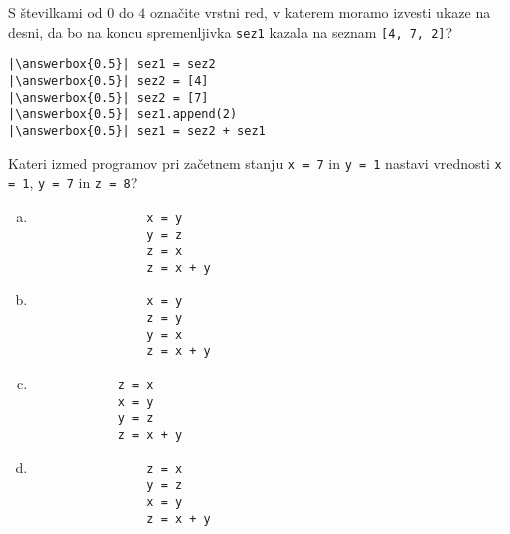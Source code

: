 \documentclass[arhiv, 10pt]{../izpit}
\newcommand{\inlinepy}[1]{\texttt{#1}}
\newcommand{\answerbox}[1]{\framebox{\vphantom{\large M}\hspace{#1cm}}}
\begin{document}
        \naloga*
        \begin{multicols}{2}
        \noindent 
        S številkami od $0$ do $4$ označite vrstni red, v katerem moramo izvesti ukaze na desni, da bo na koncu spremenljivka \inlinepy{sez1} kazala na seznam \inlinepy{[4, 7, 2]}?
    
        \columnbreak
        \noindent
        \begin{verbatim}
|\answerbox{0.5}| sez1 = sez2
|\answerbox{0.5}| sez2 = [4]
|\answerbox{0.5}| sez2 = [7]
|\answerbox{0.5}| sez1.append(2)
|\answerbox{0.5}| sez1 = sez2 + sez1

        \end{verbatim}
        \end{multicols}
    
            
        \naloga*
        
        Kateri izmed programov pri začetnem stanju
            \inlinepy{x = 7} in
            \inlinepy{y = 1}
        nastavi vrednosti
            \inlinepy{x = 1},
            \inlinepy{y = 7} in
            \inlinepy{z = 8}?
    
        \begin{multicols}{4}
        \begin{enumerate}[(a)]
\item 
                \begin{verbatim}
                x = y
                y = z
                z = x
                z = x + y
                \end{verbatim}
            
\item 
                \begin{verbatim}
                x = y
                z = y
                y = x
                z = x + y
                \end{verbatim}
            
\item 
            \begin{verbatim}
            z = x
            x = y
            y = z
            z = x + y
            \end{verbatim}
        
\item 
                \begin{verbatim}
                z = x
                y = z
                x = y
                z = x + y
                \end{verbatim}
            
\end{enumerate}

        \end{multicols}
    
\end{document}
